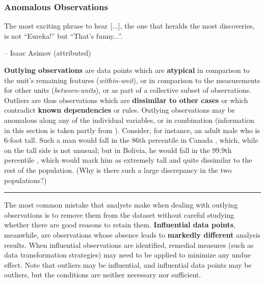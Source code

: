 \subsubsection{Anomalous Observations}
\begin{tcolorbox}[title=The Good Doctor's Take]
The most exciting phrase to hear [...], the one that heralds the most discoveries, is not ``Eureka!'' but ``That's funny...''.
 \\[-0.6cm]
\begin{flushright}
-- Isaac Asimov (attributed) 
\end{flushright}
\end{tcolorbox}
\noindent
\textbf{Outlying observations} are data points which are \textbf{atypical} in comparison to the unit's remaining features (\textit{within-unit}), or in comparison to the measurements for other units (\textit{between-units}), or as part of a collective subset of observations. Outliers are thus observations which are \textbf{dissimilar to other cases} or which contradict \textbf{known dependencies} or rules. Outlying observations may be anomalous along any of the individual variables, or in combination (information in this section is taken partly from \cite{DP_OW,DP_A,DP_T,DP_CBK}).
\newl Consider, for instance, an adult male who is 6-foot tall. Such a man would fall in the 86th percentile in Canada \cite{DP_HPC}, which, while on the tall side is not unusual; but in Bolivia, he would fall in the 99.9th percentile \cite{DP_HPC}, which would mark him as extremely tall and quite dissimilar to the rest of the population. (Why is there such a large discrepancy in the two populations?)  
\begin{center}
    \rule{0.5\textwidth}{.4pt}
\end{center}
The most common mistake that analysts make when dealing with outlying observations is to remove them from the dataset without careful studying whether there are good reasons to retain them. \newl \textbf{Influential data points}, meanwhile, are observations whose absence leads to \textbf{markedly different} analysis results. When influential observations are identified, remedial measures (such as data transformation strategies) may need to be applied to minimize any undue effect. Note that outliers may be influential, and influential data points may be outliers, but the conditions are neither necessary nor sufficient. 
